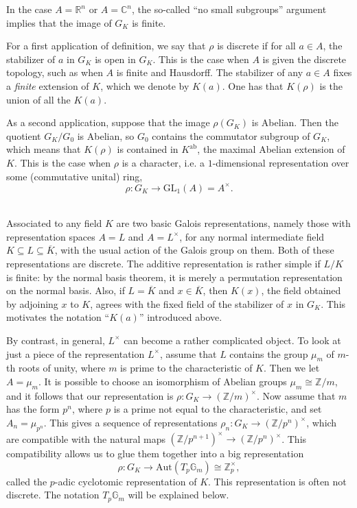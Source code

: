 \documentclass[12pt]{article}
\newcommand{\ab}{\mathrm{ab}}
\newcommand{\Aut}{\mathrm{Aut}}
\newcommand{\bbC}{\mathbb{C}}
\newcommand{\bbR}{\mathbb{R}}
\newcommand{\bbZ}{\mathbb{Z}}
\newcommand{\cn}{\colon}
\newcommand{\GL}{\mathrm{GL}}
\newcommand{\ov}[1]{\overline{#1}}
\begin{document}
In the case $A = \bbR^n$ or $A = \bbC^n$, the so-called ``no small subgroups'' argument implies that the image of $G_K$ is finite.

For a first application of definition, we say that $\rho$ is discrete if for all $a \in A$, the stabilizer of $a$ in $G_K$ is open in $G_K$.  This is the case when $A$ is given the discrete topology, such as when $A$ is finite and Hausdorff.  The stabilizer of any $a \in A$ fixes a {\it finite} extension of $K$, which we denote by $K(a)$.  One has that $K(\rho)$ is the union of all the $K(a)$.

As a second application, suppose that the image $\rho(G_K)$ is Abelian.  Then the quotient $G_K/G_0$ is Abelian, so $G_0$ contains the commutator subgroup of $G_K$, which means that $K(\rho)$ is contained in $K^\ab$, the maximal Abelian extension of $K$.  This is the case when $\rho$ is a character, i.e. a $1$-dimensional representation over some (commutative unital) ring,
\[
\rho \cn G_K \to \GL_1(A) = A^\times.
\]

\ \\

Associated to any field $K$ are two basic Galois representations, namely those with representation spaces $A = L$ and $A = L^\times$, for any normal intermediate field $K \subseteq L \subseteq \ov{K}$, with the usual action of the Galois group on them.  Both of these representations are discrete.  The additive representation is rather simple if $L/K$ is finite:  by the normal basis theorem, it is merely a permutation representation on the normal basis.  Also, if $L = \ov{K}$ and $x \in \ov{K}$, then $K(x)$, the field obtained by adjoining $x$ to $K$, agrees with the fixed field of the stabilizer of $x$ in $G_K$.  This motivates the notation ``$K(a)$'' introduced above.

By contrast, in general, $L^\times$ can become a rather complicated object.  To look at just a piece of the representation $L^\times$, assume that $L$ contains the group $\mu_m$ of $m$-th roots of unity, where $m$ is prime to the characteristic of $K$.  Then we let $A = \mu_m$.  It is possible to choose an isomorphism of Abelian groups $\mu_m \cong \bbZ/m$, and it follows that our representation is $\rho \cn G_K \to (\bbZ/m)^\times$.  Now assume that $m$ has the form $p^n$, where $p$ is a prime not equal to the characteristic, and set $A_n = \mu_{p^n}$.  This gives a sequence of representations $\rho_n \cn G_K \to (\bbZ/p^n)^\times$, which are compatible with the natural maps $(\bbZ/p^{n+1})^\times \to (\bbZ/p^n)^\times$.  This compatibility allows us to glue them together into a big representation
\[
\rho \cn G_K \to \Aut(T_p\mathbb{G}_m) \cong \bbZ_p^\times,
\]
called the $p$-adic cyclotomic representation of $K$.  This representation is often not discrete.  The notation $T_p\mathbb{G}_m$ will be explained below.
\end{document}
